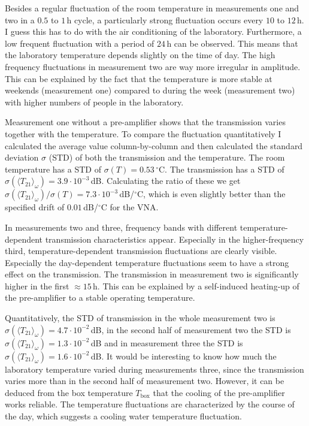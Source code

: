 Besides a regular fluctuation of the room temperature in measurements one and two in a $0.5$ to $1\,$h cycle, a particularly strong fluctuation occurs every $10$ to $12\,$h. I guess this has to do with the air conditioning of the laboratory. Furthermore, a low frequent fluctuation with a period of $24\,$h can be observed. This means that the laboratory temperature depends slightly on the time of day. The high frequency fluctuations in measurement two are way more irregular in amplitude. This can be explained by the fact that the temperature is more stable at weekends (measurement one) compared to during the week (measurement two) with higher numbers of people in the laboratory.

Measurement one without a pre-amplifier shows that the transmission varies together with the temperature. To compare the fluctuation quantitatively I calculated the average value column-by-column and then calculated the standard deviation $\sigma$ (STD) of both the transmission and the temperature. The room temperature has a STD of $\sigma(T)=0.53\,^\circ$C. The transmission has a STD of $\sigma(\langle T_{21}\rangle_\omega)=3.9\cdot10^{-3}\,$dB. Calculating the ratio of these we get $\sigma(\langle T_{21}\rangle_\omega)/\sigma(T)=7.3\cdot10^{-3}\,$dB/$^\circ$C, which is even slightly better than the specified drift of $0.01\,$dB/$^\circ$C for the VNA. \cite{ZNB40brochure}

In measurements two and three, frequency bands with different temperature-dependent transmission characteristics appear. Especially in the higher-frequency third, temperature-dependent transmission fluctuations are clearly visible. Especially the day-dependent temperature fluctuations seem to have a strong effect on the transmission. The transmission in measurement two is significantly higher in the first $\approx15\,$h. This can be explained by a self-induced heating-up of the pre-amplifier to a stable operating temperature.

Quantitatively, the STD of transmission in the whole measurement two is $\sigma(\langle T_{21}\rangle_\omega)=4.7\cdot10^{-2}\,$dB, in the second half of measurement two the STD is $\sigma(\langle T_{21}\rangle_\omega)=1.3\cdot10^{-2}\,$dB and in measurement three the STD is $\sigma(\langle T_{21}\rangle_\omega)=1.6\cdot10^{-2}\,$dB. It would be interesting to know how much the laboratory temperature varied during measurements three, since the transmission varies more than in the second half of measurement two. However, it can be deduced from the box temperature $T_\text{box}$ that the cooling of the pre-amplifier works reliable. The temperature fluctuations are characterized by the course of the day, which suggests a cooling water temperature fluctuation.


